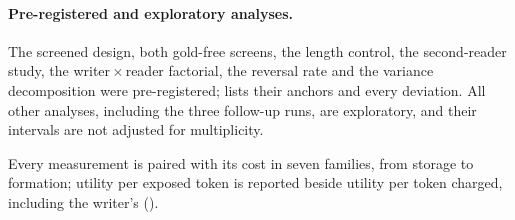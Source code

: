 \paragraph{Pre-registered and exploratory analyses.}
The screened design, both gold-free screens, the length control, the
second-reader study, the writer\,$\times$\,reader factorial, the reversal rate
and the variance decomposition were pre-registered;  lists
their anchors and every deviation. All other analyses, including the three
follow-up runs, are exploratory, and their intervals are not adjusted for
multiplicity.

Every measurement is paired with its cost in seven families, from storage to
formation; utility per exposed token is reported beside utility per token
charged, including the writer's ().

